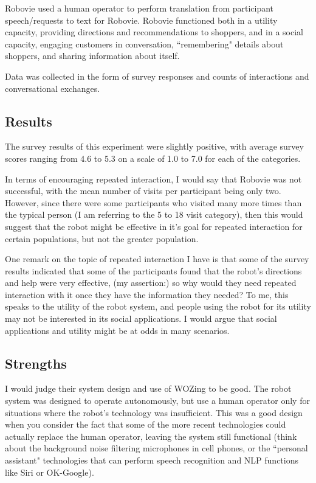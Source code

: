 \documentclass{article}
\begin{document}
Robovie used a human operator to perform translation from participant speech/requests to text for Robovie. Robovie functioned both in a utility capacity, providing directions and recommendations to shoppers, and in a social capacity, engaging customers in conversation, ``remembering" details about shoppers, and sharing information about itself.

Data was collected in the form of survey responses and counts of interactions and conversational exchanges.

\subsection{Results}
The survey results of this experiment were slightly positive, with average survey scores ranging from 4.6 to 5.3 on a scale of 1.0 to 7.0 for each of the categories.

In terms of encouraging repeated interaction, I would say that Robovie was not successful, with the mean number of visits per participant being only two. However, since there were some participants who visited many more times than the typical person (I am referring to the 5 to 18 visit category), then this would suggest that the robot might be effective in it's goal for repeated interaction for certain populations, but not the greater population.

One remark on the topic of repeated interaction I have is that some of the survey results indicated that some of the participants found that the robot's directions and help were very effective, (my assertion:) so why would they need repeated interaction with it once they have the information they needed? To me, this speaks to the utility of the robot system, and people using the robot for its utility may not be interested in its social applications. I would argue that social applications and utility might be at odds in many scenarios.

\subsection{Strengths}
I would judge their system design and use of WOZing to be good. The robot system was designed to operate autonomously, but use a human operator only for situations where the robot's technology was insufficient. This was a good design when you consider the fact that some of the more recent technologies could actually replace the human operator, leaving the system still functional (think about the background noise filtering microphones in cell phones, or the ``personal assistant" technologies that can perform speech recognition and NLP functions like Siri or OK-Google).
\end{document}
